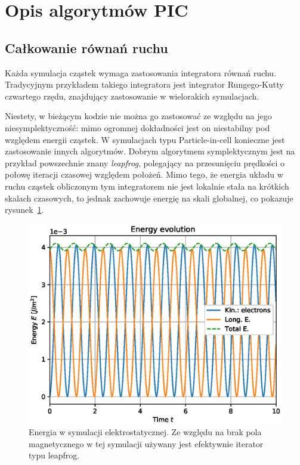 \section[Opis algorytmów PIC]{Opis algorytmów PIC}%
\subsection{Całkowanie równań ruchu}
Każda symulacja cząstek wymaga zastosowania integratora równań ruchu.
Tradycyjnym przykładem takiego integratora jest integrator Rungego-Kutty
czwartego rzędu, znajdujący zastosowanie w wielorakich symulacjach.

Niestety, w bieżącym kodzie nie można go zastosować ze względu na jego
niesymplektyczność: mimo ogromnej dokładności jest on niestabilny pod
względem energii cząstek\cite{computational-physics}. W symulacjach typu
Particle-in-cell konieczne jest zastosowanie innych algorytmów. Dobrym
algorytmem symplektycznym jest na przykład powszechnie znany
\emph{leapfrog}, polegający na przesunięciu prędkości o połowę iteracji
czasowej względem położeń.\cite{computational-physics} Mimo tego, że energia
układu w ruchu cząstek obliczonym tym integratorem nie jest lokalnie stała na
krótkich skalach czasowych, to jednak zachowuje energię na skali globalnej, co
pokazuje rysunek~\ref{fig:ESE-energy}. %

\begin{figure}[h!]
  \includegraphics{Images/ESE_energy_plot}
  \caption{Energia w symulacji elektrostatycznej. Ze względu na brak pola magnetycznego
  w tej symulacji używany jest efektywnie iterator typu leapfrog.\label{fig:ESE-energy}}
\end{figure}

